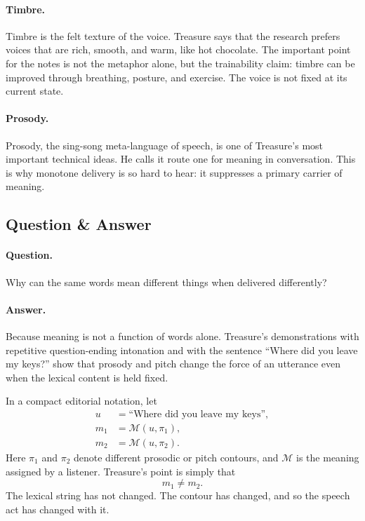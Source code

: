 \paragraph{Timbre.} Timbre is the felt texture of the voice. Treasure says that the research prefers voices that are rich, smooth, and warm, like hot chocolate. The important point for the notes is not the metaphor alone, but the trainability claim: timbre can be improved through breathing, posture, and exercise. The voice is not fixed at its current state.

\paragraph{Prosody.} Prosody, the sing-song meta-language of speech, is one of Treasure's most important technical ideas. He calls it route one for meaning in conversation. This is why monotone delivery is so hard to hear: it suppresses a primary carrier of meaning.

\subsection{Question \& Answer}

\paragraph{Question.} Why can the same words mean different things when delivered differently?

\paragraph{Answer.} Because meaning is not a function of words alone. Treasure's demonstrations with repetitive question-ending intonation and with the sentence ``Where did you leave my keys?'' show that prosody and pitch change the force of an utterance even when the lexical content is held fixed.

In a compact editorial notation, let
\begin{align}
u &= \text{``Where did you leave my keys''},\\
m_1 &= \mathcal{M}(u,\pi_1),\\
m_2 &= \mathcal{M}(u,\pi_2).
\end{align}
Here \(\pi_1\) and \(\pi_2\) denote different prosodic or pitch contours, and \(\mathcal{M}\) is the meaning assigned by a listener. Treasure's point is simply that
\begin{equation}
m_1 \neq m_2.
\end{equation}
The lexical string has not changed. The contour has changed, and so the speech act has changed with it.

